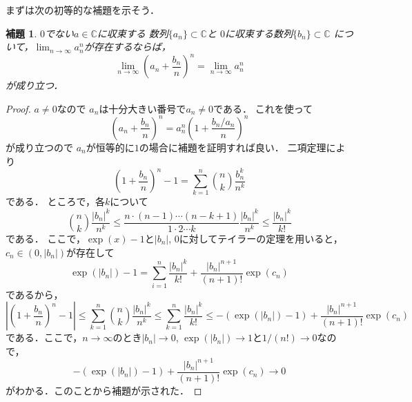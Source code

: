 \documentclass[leqno, 12pt]{jsarticle}
\newtheorem{lem}[thm]{補題}
\newcommand{\cc}{\mathbb{C}}
\begin{document}
まずは次の初等的な補題を示そう．
\begin{lem}\label{lem:elem}
$0$でない$a\in \cc$に収束する
数列$\{a_n\}\subset \cc$と
$0$に収束する数列$\{b_n\}\subset \cc$
について，$\lim_{n\to \infty}a_{n}^{n}$が存在するならば，
\[
\lim_{n\to \infty}\left(a_n+\frac{b_n}{n}\right)^n=\lim_{n\to \infty}a_n^n
\]
が成り立つ．
\end{lem}
\begin{proof}
$a\neq 0$なので
$a_n$は十分大きい番号で$a_n\neq 0$である．
これを使って
\[
\left(a_n+\frac{b_n}{n}\right)^n=a_n^n\left(1+\frac{b_n/a_n}{n}\right)^n
\]
が成り立つので
$a_n$が恒等的に$1$の場合に補題を証明すれば良い．
二項定理により
\[
	\left(1+\frac{b_n}{n}\right)^n-1
	=
	\sum_{k=1}^n\binom{n}{k}\frac{b_n^k}{n^k}
\]
である．
ところで，各$k$について
\[
	\binom{n}{k}\frac{|b_n|^k}{n^k}
	\le
	 \frac{n\cdot (n-1)\cdots (n-k+1)}{1\cdot 2\cdots k}\frac{|b_n|^k}{n^k}
	 \le 
	 \frac{|b_n|^k}{k!}
\]
である．
ここで，$\exp(x)-1$と$|b_n|$, $0$に対してテイラーの定理を用いると，
$c_n\in (0, |b_n|)$が存在して
\[
\exp(|b_n|)-1=\sum_{i=1}^n\frac{|b_n|^k}{k!}+\frac{|b_n|^{n+1}}{(n+1)!}\exp(c_n)
\]
であるから，
\[
	\left|\left(1+\frac{b_n}{n}\right)^n-1\right|
	\le
	\sum_{k=1}^n\binom{n}{k}\frac{|b_n|^k}{n^k}
	\le 
	\sum_{k=1}^n\frac{|b_n|^k}{k!}
	\le  -(\exp(|b_n|)-1)+\frac{|b_n|^{n+1}}{(n+1)!}\exp(c_n)
\]
である．ここで，$n\to \infty$のとき$|b_n|\to 0$, 
$\exp(|b_n|)\to 1$と$1/(n!)\to 0$なので，
\[
-(\exp(|b_n|)-1)+\frac{|b_n|^{n+1}}{(n+1)!}\exp(c_n)\to 0
\]
がわかる．このことから補題が示された．
\end{proof}
\end{document}
